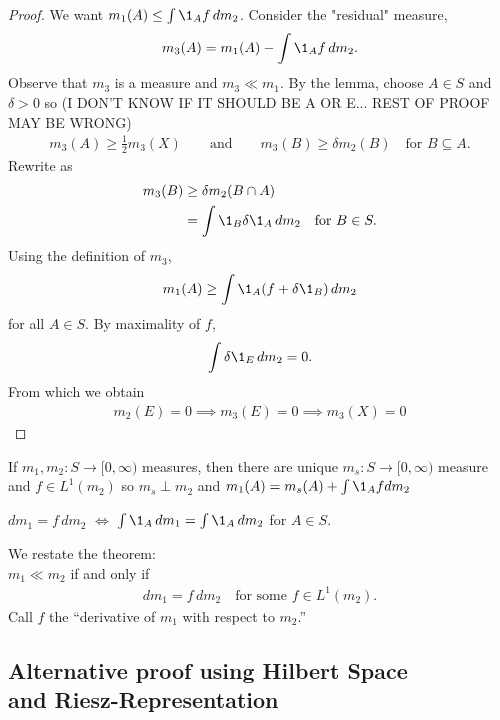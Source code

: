 \begin{proof}
	We want $m_1 (A) \leq \int \1_{A} f \, dm_2$.
	Consider the "residual" measure,
	\[
		m_3 (A) = m_1 (A) - \int \1_{A} f \, dm_2.
	\]
	Observe that $m_3$ is a measure and $m_3 \ll m_1$.
	By the lemma, choose $A \in S$ and $\delta > 0$ so (I DON'T KNOW IF IT SHOULD BE A OR E... REST OF PROOF MAY BE WRONG)
	\begin{align*}
		m_3 (A) \geq \frac{1}{2} m_3 (X)
		\qquad \text{and} \qquad m_3 (B) \geq \delta m_2 (B) \quad \text{for } B \subseteq A.
	\end{align*}
	Rewrite as
	\begin{align*}
		m_3 (B) &\geq \delta m_2 ( B \cap A) \\
				&= \int \1_{B} \delta \1_A \, dm_2 \quad \text{for } B \in S.
	\end{align*}
	Using the definition of $m_3$,
	\begin{align*}
		m_1 (A) \geq \int \1_A (f + \delta \1_B ) \, dm_2
	\end{align*}
	for all $A \in S$. By maximality of $f$,
		\[
			\int \delta \1_E \, dm_2 = 0.
		\]
	From which we obtain
	\begin{align*}
		m_2 (E) = 0 \implies m_3 (E) = 0 \implies m_3 (X) = 0
	\end{align*}
\end{proof}

\begin{corollary}
	If $m_1, m_2 : S \to [0, \infty)$ measures, then there are unique $m_s :S \to [0, \infty)$ measure and
	$f \in L^{1} (m_2)$ so $m_s \perp m_2$ and $m_1 (A) = m_s (A) + \int \1_A f d m_2$
\end{corollary}

\begin{notation}
	$dm_1 = f \, dm_2$ $\iff $ $\int \1_A \, dm_1 = \int \1_A \, dm_2$ for $A \in S$.
\end{notation}

\begin{theorem} We restate the theorem: \\
	$m_1 \ll m_2$ if and only if
	\begin{align*}
		dm_1 = f \, dm_2 \quad \text{for some } f \in L^1 (m_2) .
	\end{align*}
	Call $f$ the ``derivative of $m_1$ with respect to $m_2$.''
\end{theorem}

\subsection[Alternative proof using Hilbert Space and Riesz-Representation]{\texorpdfstring{Alternative proof using Hilbert Space \\ and Riesz-Representation}{Alternative proof using Hilbert Space and Riesz-Representation}}

